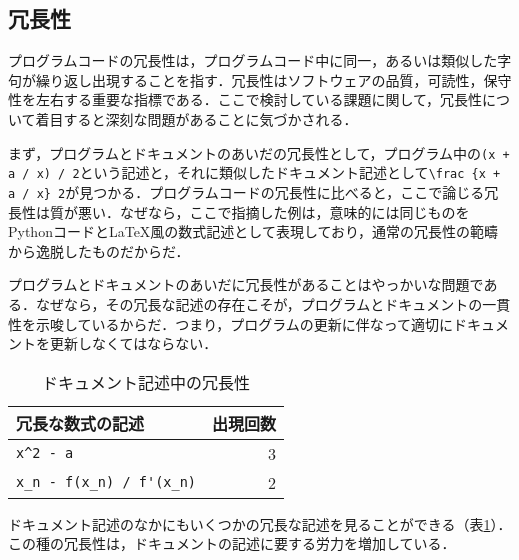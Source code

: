 \subsection {冗長性}
\label {ssec: redundancy}

プログラムコードの冗長性は，プログラムコード中に同一，あるいは類似した字句が繰り返し出現することを指す．冗長性はソフトウェアの品質，可読性，保守性を左右する重要な指標である．ここで検討している課題に関して，冗長性について着目すると深刻な問題があることに気づかされる．

まず，プログラムとドキュメントのあいだの冗長性として，プログラム中の\verb|(x + a / x) / 2|という記述と，それに類似したドキュメント記述として\verb|\frac {x + a / x} 2|が見つかる．プログラムコードの冗長性に比べると，ここで論じる冗長性は質が悪い．なぜなら，ここで指摘した例は，意味的には同じものをPythonコードとLaTeX風の数式記述として表現しており，通常の冗長性の範疇から逸脱したものだからだ．

プログラムとドキュメントのあいだに冗長性があることはやっかいな問題である．なぜなら，その冗長な記述の存在こそが，プログラムとドキュメントの一貫性を示唆しているからだ．つまり，プログラムの更新に伴なって適切にドキュメントを更新しなくてはならない．

\begin {table}
\caption {ドキュメント記述中の冗長性}
\label {tbl: ドキュメント記述中の冗長性}

\begin {center}
\begin {tabular}{lr} \hline
\textbf {冗長な数式の記述} & \textbf {出現回数} \\ \hline
\verb|x^2 - a| & 3 \\
\verb|x_n - f(x_n) / f'(x_n)| & 2 \\
\hline
\end {tabular}
\end {center}
\end {table}

ドキュメント記述のなかにもいくつかの冗長な記述を見ることができる（表\ref {tbl: ドキュメント記述中の冗長性}）．この種の冗長性は，ドキュメントの記述に要する労力を増加している．
